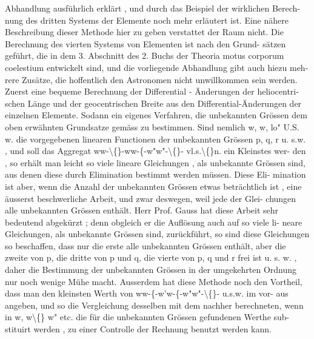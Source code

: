 \documentclass[12pt,a4paper]{article}
\begin{document}
Abhandlung  ausführlich  erklärt ,  und  durch  das  Beispiel  der  wirklichen  Berech-
nung des  dritten  Systems  der  Elemente  noch  mehr  erläutert  ist.  Eine  nähere
Beschreibung  dieser  Methode  hier  zu  geben  verstattet  der  Raum  nicht.
Die  Berechnung  des  vierten  Systems  von  Elementen  ist  nach  den  Grund-
sätzen geführt,  die  in  dem  3.  Abschnitt  des  2.  Buchs  der  Theoria  motus  corporum
coelestium  entwickelt  sind,  und  die  vorliegende  Abhandlung  gibt  auch  hiezu  meh-
rere Zusätze,  die  hoffentlich  den  Astronomen  nicht  unwillkommen  sein  werden.
Zuerst  eine  bequeme  Berechnung  der  Differential  -  Änderungen  der  heliocentri-
schen  Länge  und  der  geocentrischen  Breite  aus  den  Differential-Änderungen  der
einzelnen  Elemente.  Sodann  ein  eigenes  Verfahren,  die  unbekannten  Grössen
dem  oben  erwähnten  Grundsatze  gemäss  zu  bestimmen.  Sind  nemlich  w,  w,  lo"
U.S.  w.  die  vorgegebenen  linearen  Functionen  der  unbekannten  Grössen  p,  q,  r
u. s.w. ,  und  soll  das  Aggregat  ww-\textbackslash\{\}-ww-\{-w"w"-\textbackslash\{\}-  vl.s.\textbackslash\{\}n.  ein  Kleinstes  wer-
den ,  so  erhält  man  leicht  so  viele  lineare  Gleichungen ,  als  unbekannte  Grössen
sind,  aus  denen  diese  durch  Elimination  bestimmt  werden  müssen.  Diese  Eli-
mination ist  aber,  wenn  die  Anzahl  der  unbekannten  Grössen  etwas  beträchtlich
ist ,  eine  äusserst  beschwerliche  Arbeit,  und  zwar  deswegen,  weil  jede  der  Glei-
chungen alle  unbekannten  Grössen  enthält.  Herr  Prof.  Gauss  hat  diese  Arbeit
sehr  bedeutend  abgekürzt ;  denn  obgleich  er  die  Auflösung  auch  auf  so  viele  li-
neare Gleichungen,  als  unbekannte  Grössen  sind,  zurückführt,  so  sind  diese
Gleichungen  so  beschaffen,  dass  nur  die  erste  alle  unbekannten  Grössen  enthält,
aber  die  zweite  von  p,  die  dritte  von  p  und  q,  die  vierte  von  p,  q  und  r  frei
ist  u.  s.  w. ,  daher  die  Bestimmung  der  unbekannten  Grössen  in  der  umgekehrten
Ordnung  nur  noch  wenige  Mühe  macht.  Ausserdem  hat  diese  Methode  noch  den
Vortheil,  dass  man  den  kleinsten  Werth  von  ww-\{-w'w-\{-w"w"-\textbackslash\{\}-  u.s.w.  im  vor-
aus angeben,  und  so  die  Vergleichung  desselben  mit  dem  nachher  berechneten,
wenn  in  w,  w\textbackslash\{\}  w"  etc.  die  für  die  unbekannten  Grössen  gefundenen  Werthe  sub-
stituirt  werden ,  zu  einer  Controlle  der  Rechnung  benutzt  werden  kann.

\newpage
\end{document}

